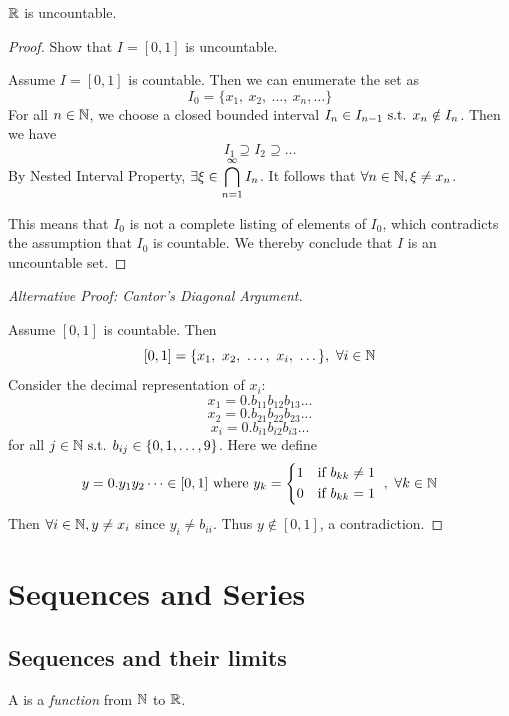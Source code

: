\documentclass[a4paper,12pt]{article}
\begin{document}
\newpage
\begin{theorem}
    \(\mathbb{R}\) is uncountable.
    \begin{proof}
         Show that \(I=[0,1]\) is uncountable.

        Assume \(I=[0,1]\) is countable. Then we can enumerate the set as 
        \[I_0=\{x_1,\ x_2,\ \dots,\ x_n,\dots\}\]
        For all \(n\in\mathbb{N}\), we choose a closed bounded interval \(I_{n}\in I_{n-1}\text{ s.t. } x_n\notin I_n\). Then we have 
        \[I_1\supseteq I_2\supseteq\dots\]
        By Nested Interval Property, \(\exists \xi\in\displaystyle\bigcap_{n=1}^{\infty}I_n\). It follows that \(\forall n\in\mathbb{N}, \xi\neq x_n\). 

        This means that \(I_0\) is not a complete listing of elements of \(I_0\), which contradicts the assumption that \(I_0\) is countable. 
        We thereby conclude that \(I\) is an uncountable set.
    \end{proof}
    \begin{proof}[Alternative Proof: Cantor's Diagonal Argument]\ 

        Assume \([0,1]\) is countable. Then 
        \[[0,1]=\{x_1,\ x_2,\ \dots,\ x_i,\ \dots\},\ \forall i\in\N\]
        Consider the decimal representation of \(x_i\):
        \[x_1=0.b_{11}b_{12}b_{13}...\]
        \[x_2=0.b_{21}b_{22}b_{23}...\]
        \[x_i=0.b_{i1}b_{i2}b_{i3}...\]
        for all \(j\in\mathbb{N}\text{ s.t. } b_{ij}\in\{0,1,\dots,9\}\). Here we define 
        \[y=0.y_1y_2\dots\in[0,1]\text{ where }y_k=\begin{cases*}
            1& if \(b_{kk}\neq 1\)\\
            0& if \(b_{kk}=1\)
        \end{cases*},\ \forall k\in\N\]
        Then \(\forall i\in\mathbb{N}, y\neq x_i\) since \(y_i\neq b_{ii}\). Thus \(y\notin [0,1]\), a contradiction.
    \end{proof}
\end{theorem}


\newpage
\section{Sequences and Series}
\subsection{Sequences and their limits}

\begin{definition}
    A  is a \textit{function} from $\mathbb{N}$ to $\mathbb{R}$.
\end{definition}
\end{document}
